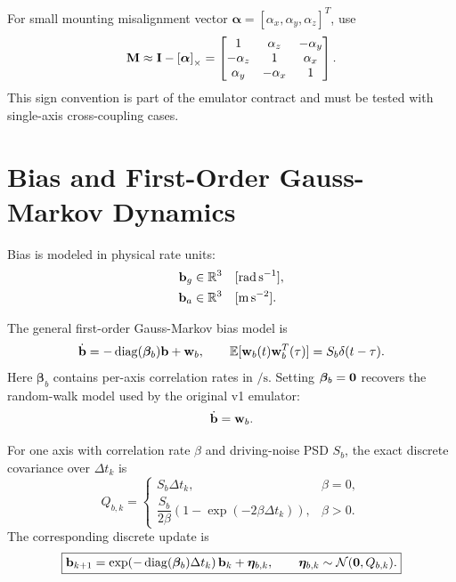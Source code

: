 For small mounting misalignment vector
$\boldsymbol{\alpha}=[\alpha_x,\alpha_y,\alpha_z]^T$, use
\begin{equation}
\mathbf{M}
\approx
\mathbf{I}-\left[\boldsymbol{\alpha}\right]_{\times}
=
\begin{bmatrix}
1 & \alpha_z & -\alpha_y\\
-\alpha_z & 1 & \alpha_x\\
\alpha_y & -\alpha_x & 1
\end{bmatrix}.
\label{eq:imu_misalignment_matrix}
\end{equation}
This sign convention is part of the emulator contract and must be tested with
single-axis cross-coupling cases.

\section{Bias and First-Order Gauss-Markov Dynamics}

Bias is modeled in physical rate units:
\begin{align}
\mathbf{b}_g &\in \mathbb{R}^3 && [\si{\radian\per\second}],\\
\mathbf{b}_a &\in \mathbb{R}^3 && [\si{\meter\per\second\squared}].
\end{align}

The general first-order Gauss-Markov bias model is
\begin{equation}
\dot{\mathbf{b}}
=
-
\operatorname{diag}(\boldsymbol\beta_b)\mathbf{b}
+
\mathbf{w}_b,
\qquad
\mathbb{E}[\mathbf{w}_b(t)\mathbf{w}_b^T(\tau)]=S_b\delta(t-\tau).
\label{eq:imu_bias_gauss_markov_continuous}
\end{equation}
Here $\boldsymbol\beta_b$ contains per-axis correlation rates in
$\si{\per\second}$. Setting $\boldsymbol\beta_b=\mathbf{0}$ recovers the random-walk
model used by the original v1 emulator:
\begin{equation}
\dot{\mathbf{b}}=\mathbf{w}_b.
\label{eq:imu_bias_random_walk_continuous}
\end{equation}

For one axis with correlation rate $\beta$ and driving-noise PSD $S_b$, the
exact discrete covariance over $\Delta t_k$ is
\begin{equation}
Q_{b,k}
=
\begin{cases}
S_b\Delta t_k, & \beta=0,\\[4pt]
\dfrac{S_b}{2\beta}
\left(1-\exp(-2\beta\Delta t_k)\right), & \beta>0.
\end{cases}
\label{eq:imu_bias_gauss_markov_discrete_covariance}
\end{equation}
The corresponding discrete update is
\begin{equation}
\boxed{
\mathbf{b}_{k+1}
=
\exp\!\left(-\operatorname{diag}(\boldsymbol\beta_b)\Delta t_k\right)\mathbf{b}_k
+
\boldsymbol{\eta}_{b,k},
\qquad
\boldsymbol{\eta}_{b,k}\sim\mathcal{N}(\mathbf{0},Q_{b,k}).
}
\label{eq:imu_bias_gauss_markov_discrete}
\end{equation}

